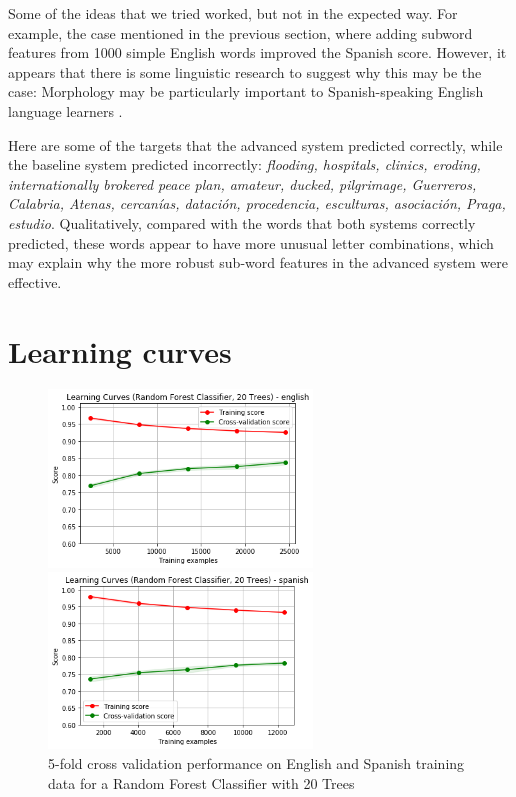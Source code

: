 \documentclass[11pt,a4paper]{article}
\begin{document}
Some of the ideas that we tried worked, but not in the expected way. For example, the case mentioned in the previous section, where adding subword features from 1000 simple English words improved the Spanish score. However, it appears that there is some linguistic research to suggest why this may be the case: Morphology may be particularly important to Spanish-speaking English language learners \cite{ramirez2010morphological}.

Here are some of the targets that the advanced system predicted correctly, while the baseline system predicted incorrectly: \emph{flooding, hospitals, clinics, eroding, internationally brokered peace plan, amateur, ducked, pilgrimage, Guerreros, Calabria, Atenas, cercanías, datación, procedencia, esculturas, asociación, Praga, estudio}. Qualitatively, compared with the words that both systems correctly predicted, these words appear to have more unusual letter combinations, which may explain why the more robust sub-word features in the advanced system were effective.

\section{Learning curves}

\begin{figure}[h]
\begin{minipage}[b]{1.0\linewidth}
  \centering
  \centerline{\includegraphics[width=7cm]{images/RFCEng}}
\end{minipage}
\begin{minipage}[b]{1.0\linewidth}
  \centering
  \centerline{\includegraphics[width=7cm]{images/RFCSp}}
\end{minipage}
\caption{5-fold cross validation performance on English and Spanish training data for a Random Forest Classifier with 20 Trees}
\label{fig:RFC}
\end{figure}
\end{document}
